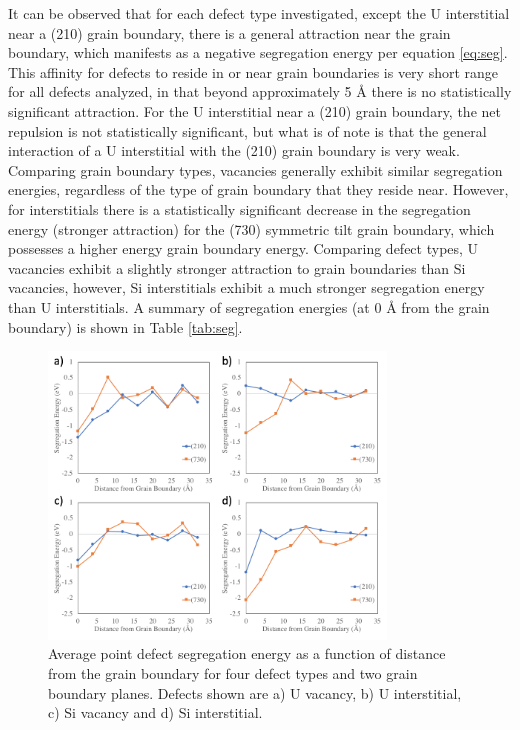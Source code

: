 \documentclass[review]{elsarticle}
\begin{document}
It can be observed that for each defect type investigated, except the U interstitial near a (210) grain boundary, there is a general attraction near the grain boundary, which manifests as a negative segregation energy per equation \ref{eq:seg}. This affinity for defects to reside in or near grain boundaries is very short range for all defects analyzed, in that beyond approximately 5 {\AA} there is no statistically significant attraction. For the U interstitial near a (210) grain boundary, the net repulsion is not statistically significant, but what is of note is that the general interaction of a U interstitial with the (210) grain boundary is very weak. Comparing grain boundary types, vacancies generally exhibit similar segregation energies, regardless of the type of grain boundary that they reside near. However, for interstitials there is a statistically significant decrease in the segregation energy (stronger attraction) for the (730) symmetric tilt grain boundary, which possesses a higher energy grain boundary energy. Comparing defect types, U vacancies exhibit a slightly stronger attraction to grain boundaries than Si vacancies, however, Si interstitials exhibit a much stronger segregation energy than U interstitials. A summary of segregation energies (at 0 {\AA} from the grain boundary) is shown in Table \ref{tab:seg}. 

\begin{figure}[h]
 \centering
 \includegraphics[width=0.8\textwidth]{gbdefs_seg.png} 
 \caption{Average point defect segregation energy as a function of distance from the grain boundary for four defect types and two grain boundary planes. Defects shown are a) U vacancy, b) U interstitial, c) Si vacancy and d) Si interstitial. }
 \label{fig:seg}
\end{figure}
\end{document}
